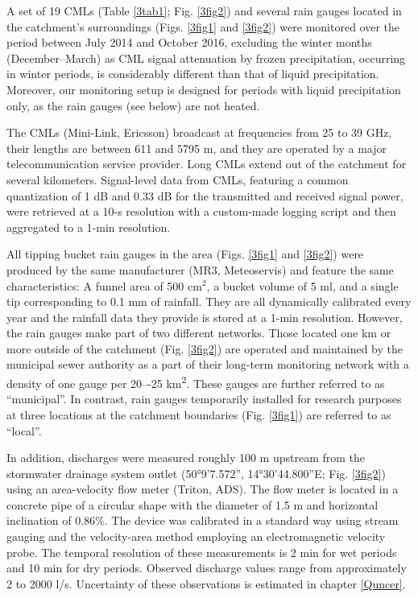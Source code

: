 \documentclass{ctuthesis}\usepackage[]{graphicx}\usepackage[]{color}
\begin{document}
A set of 19 CMLs (Table \ref{3tab1}; Fig. \ref{3fig2}) and several rain gauges located in the catchment's surroundings (Figs. \ref{3fig1} and \ref{3fig2}) were monitored over the period between July 2014 and October 2016, excluding the winter months (December--March) as CML signal attenuation by frozen precipitation, occurring in winter periods, is considerably different than that of liquid precipitation. Moreover, our monitoring setup is designed for periods with liquid precipitation only, as the rain gauges (see below) are not heated.

The CMLs (Mini-Link, Ericsson) broadcast at frequencies from 25 to 39 GHz, their lengths are between 611 and 5795 m, and they are operated by a major telecommunication service provider. Long CMLs extend out of the catchment for several kilometers. Signal-level data from CMLs, featuring a common quantization of 1 dB and 0.33 dB for the transmitted and received signal power, were retrieved at a 10-s resolution with a custom-made logging script \citep{fenclCommercialMicrowaveLinks2015} and then aggregated to a 1-min resolution.

All tipping bucket rain gauges in the area (Figs. \ref{3fig1} and \ref{3fig2}) were produced by the same manufacturer (MR3, Meteoservis)  and feature the same characteristics:  A funnel area of 500 cm$^2$, a bucket volume of 5 ml, and a single tip corresponding to 0.1 mm of rainfall. They are all dynamically calibrated \citep{humphreyNewMethodAutomated1997} every year and the rainfall data they provide is stored at a 1-min resolution. However, the rain gauges make part of two different networks. Those located one km or more outside of the catchment (Fig. \ref{3fig2}) are operated and maintained by the municipal sewer authority as a part of their long-term monitoring network with a density of one gauge per 20–-25 km\textsuperscript{2}. These gauges are further referred to as \enquote{municipal}. In contrast, rain gauges temporarily installed for research purposes at three locations at the catchment boundaries (Fig. \ref{3fig1}) are referred to as \enquote{local}. 

In addition, discharges were measured roughly 100 m upstream from the stormwater drainage system outlet (50°9'7.572'', 14°30'44.800''E; Fig. \ref{3fig2})  using an area-velocity flow meter (Triton, ADS). The flow meter is located in a concrete pipe of a circular shape with the diameter of 1.5 m and horizontal inclination of 0.86\%. The device was calibrated in a standard way using stream gauging and the velocity-area method employing an electromagnetic velocity probe. The temporal resolution of these measurements is 2 min for wet periods and 10 min for dry periods. Observed discharge values range from approximately 2 to 2000 l/s. Uncertainty of these observations is estimated in chapter \ref{Quncer}.
\end{document}
